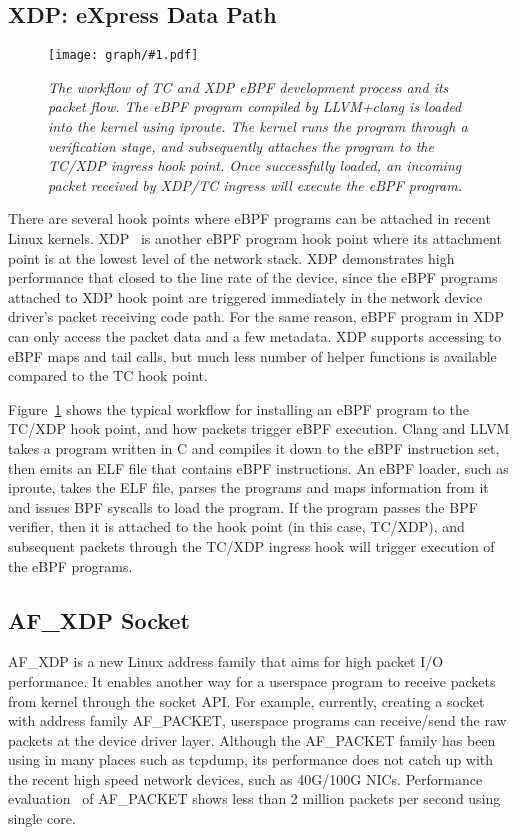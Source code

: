 \documentclass[10pt]{sigplanconf}
\newcommand{\myfig}[3]
 {
 \begin{figure}
 \centerline{\texttt{[image: graph/\#1.pdf]}}
 \caption{\sl \small #3}
 \label{#1:fig}
 \vspace*{-0.15in}
 \end{figure}
 }
\begin{document}
\subsection{XDP: eXpress Data Path}
\myfig{tcebpf}{2.6in}{The workflow of TC and XDP eBPF development process and its
packet flow.  The eBPF program compiled by LLVM+clang is loaded into the kernel
using iproute. The kernel runs the program through a verification stage, and
subsequently attaches the program to the TC/XDP ingress hook point.  Once
successfully loaded, an incoming packet received by XDP/TC ingress will execute the
eBPF program.}

There are several hook points where eBPF programs can be attached in recent
Linux kernels. XDP~\cite{xdp,xdp2} is another eBPF program hook point where
its attachment point is at the lowest level of the network stack.
XDP demonstrates high performance that closed to the line rate of the device,
since the eBPF programs attached to XDP hook point are triggered immediately
in the network device driver's packet receiving code path. For the same reason,
eBPF program in XDP can only access the packet data and a few metadata.
XDP supports accessing to eBPF maps and tail calls, but much less number of
helper functions is available compared to the TC hook point.

Figure~\ref{tcebpf:fig}
shows the typical workflow for installing an eBPF program to the TC/XDP hook point,
and how packets trigger eBPF execution.  Clang and LLVM takes a program
written in C and compiles it down to the eBPF instruction set, then emits an
ELF file that contains eBPF instructions.  An eBPF loader, such as iproute,
takes the ELF file, parses the programs and maps information from it and
issues BPF syscalls to load the program.  If the program passes the BPF verifier,
then it is attached to the hook point (in this case, TC/XDP), and
subsequent packets through the TC/XDP ingress hook will trigger execution of the
eBPF programs.

\subsection{AF\_XDP Socket}
AF\_XDP is a new Linux address family that aims for high packet I/O
performance. It enables another way for a userspace program to receive
packets from kernel through the socket API. For example, currently, creating
a socket with address family AF\_PACKET, userspace programs can receive/send
the raw packets
at the device driver layer.  Although the AF\_PACKET family has been using
in many places such as tcpdump, its performance does not catch up with the
recent high speed network devices, such as 40G/100G NICs.
Performance evaluation~\cite{af_packet_v4,af_packet_performance} of AF\_PACKET
shows less than 2 million packets per second using single core.
\end{document}
